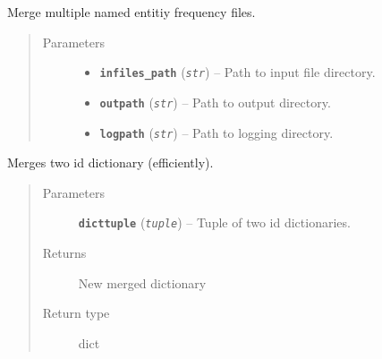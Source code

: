 \documentclass[letterpaper,10pt,english]{sphinxmanual}
\begin{document}

\begin{fulllineitems}
\label{src.prep.nes:src.prep.nes.merge.merge_frequency_files}
Merge multiple named entitiy frequency files.
\begin{quote}\begin{description}
\item[{Parameters}] \leavevmode\begin{itemize}
\item {} 
\textbf{\texttt{infiles\_path}} (\emph{\texttt{str}}) -- Path to input file directory.

\item {} 
\textbf{\texttt{outpath}} (\emph{\texttt{str}}) -- Path to output directory.

\item {} 
\textbf{\texttt{logpath}} (\emph{\texttt{str}}) -- Path to logging directory.

\end{itemize}

\end{description}\end{quote}

\end{fulllineitems}


\begin{fulllineitems}
\label{src.prep.nes:src.prep.nes.merge.merge_id_dicts}
Merges two id dictionary (efficiently).
\begin{quote}\begin{description}
\item[{Parameters}] \leavevmode
\textbf{\texttt{dicttuple}} (\emph{\texttt{tuple}}) -- Tuple of two id dictionaries.

\item[{Returns}] \leavevmode
New merged dictionary

\item[{Return type}] \leavevmode
dict

\end{description}\end{quote}

\end{fulllineitems}
\end{document}
